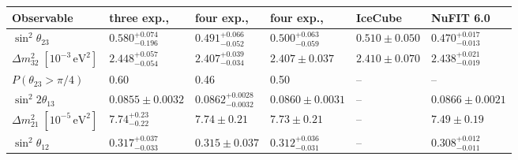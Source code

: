 \begin{tabular}{@{}llllll@{}}
  \toprule
  Observable & three exp., \mw{} & four exp., \mw{} & four exp., \mh{} & IceCube & NuFIT 6.0 \\
  \midrule
  \(\sin^2\theta_{23}\) & \(0.580^{+0.074}_{-0.196}\) & \(0.491^{+0.066}_{-0.052}\) & \(0.500^{+0.063}_{-0.059}\) & \(0.510 \pm 0.050\) & \(0.470^{+0.017}_{-0.013}\) \\
  \(\Delta m^2_{32}\;[10^{-3}\,\mathrm{eV}^2]\) & \(2.448^{+0.057}_{-0.054}\) & \(2.407^{+0.039}_{-0.034}\) & \(2.407 \pm 0.037\) & \(2.410 \pm 0.070\) & \(2.438^{+0.021}_{-0.019}\) \\
  \(P(\theta_{23} > \pi/4)\) & 0.60 & 0.46 & 0.50 & -- & -- \\
  \(\sin^2 2\theta_{13}\) & \(0.0855 \pm 0.0032\) & \(0.0862^{+0.0028}_{-0.0032}\) & \(0.0860 \pm 0.0031\) & -- & \(0.0866 \pm 0.0021\) \\
  \(\Delta m^2_{21}\;[10^{-5}\,\mathrm{eV}^2]\) & \(7.74^{+0.23}_{-0.22}\) & \(7.74 \pm 0.21\) & \(7.73 \pm 0.21\) & -- & \(7.49 \pm 0.19\) \\
  \(\sin^2\theta_{12}\) & \(0.317^{+0.037}_{-0.033}\) & \(0.315 \pm 0.037\) & \(0.312^{+0.036}_{-0.031}\) & -- & \(0.308^{+0.012}_{-0.011}\) \\
  \bottomrule
\end{tabular}
